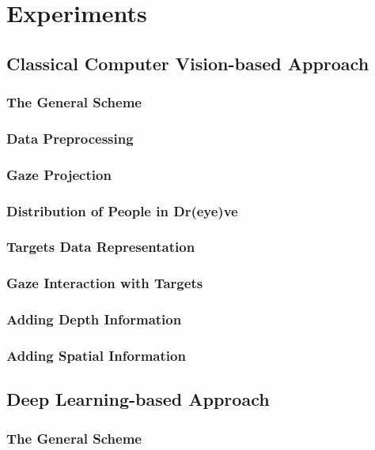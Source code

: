 \chapter{Experiments}

\section{Classical Computer Vision-based Approach}
\subsection{The General Scheme}
\subsection{Data Preprocessing}
\subsection{Gaze Projection}
\subsection{Distribution of People in Dr(eye)ve}

\subsection{Targets Data Representation}

\subsection{Gaze Interaction with Targets}

\subsection{Adding Depth Information}

\subsection{Adding Spatial Information}


\section {Deep Learning-based Approach}
\subsection{The General Scheme}
